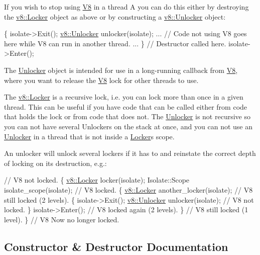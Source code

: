If you wish to stop using \hyperlink{classv8_1_1V8}{V8} in a thread A you can do this either by destroying the \hyperlink{classv8_1_1Locker}{v8\+::\+Locker} object as above or by constructing a \hyperlink{classv8_1_1Unlocker}{v8\+::\+Unlocker} object\+:


\begin{DoxyCode}
\{
  isolate->Exit();
  \hyperlink{classv8_1_1Unlocker}{v8::Unlocker} unlocker(isolate);
  ...
  \textcolor{comment}{// Code not using V8 goes here while V8 can run in another thread.}
  ...
\} \textcolor{comment}{// Destructor called here.}
isolate->Enter();
\end{DoxyCode}


The \hyperlink{classv8_1_1Unlocker}{Unlocker} object is intended for use in a long-\/running callback from \hyperlink{classv8_1_1V8}{V8}, where you want to release the \hyperlink{classv8_1_1V8}{V8} lock for other threads to use.

The \hyperlink{classv8_1_1Locker}{v8\+::\+Locker} is a recursive lock, i.\+e. you can lock more than once in a given thread. This can be useful if you have code that can be called either from code that holds the lock or from code that does not. The \hyperlink{classv8_1_1Unlocker}{Unlocker} is not recursive so you can not have several Unlockers on the stack at once, and you can not use an \hyperlink{classv8_1_1Unlocker}{Unlocker} in a thread that is not inside a \hyperlink{classv8_1_1Locker}{Locker}\textquotesingle{}s scope.

An unlocker will unlock several lockers if it has to and reinstate the correct depth of locking on its destruction, e.\+g.\+:


\begin{DoxyCode}
\textcolor{comment}{// V8 not locked.}
\{
  \hyperlink{classv8_1_1Locker}{v8::Locker} locker(isolate);
  Isolate::Scope isolate\_scope(isolate);
  \textcolor{comment}{// V8 locked.}
  \{
    \hyperlink{classv8_1_1Locker}{v8::Locker} another\_locker(isolate);
    \textcolor{comment}{// V8 still locked (2 levels).}
    \{
      isolate->Exit();
      \hyperlink{classv8_1_1Unlocker}{v8::Unlocker} unlocker(isolate);
      \textcolor{comment}{// V8 not locked.}
    \}
    isolate->Enter();
    \textcolor{comment}{// V8 locked again (2 levels).}
  \}
  \textcolor{comment}{// V8 still locked (1 level).}
\}
\textcolor{comment}{// V8 Now no longer locked.}
\end{DoxyCode}
 

\subsection{Constructor \& Destructor Documentation}
